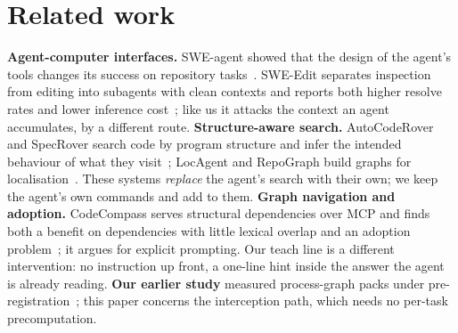 \documentclass[conference]{IEEEtran}
\begin{document}
\section{Related work}\label{sec:related}
\textbf{Agent-computer interfaces.} SWE-agent showed that the design of the agent's tools changes its success on
repository tasks~\cite{yang2024sweagent}. SWE-Edit separates inspection from editing into subagents with clean contexts
and reports both higher resolve rates and lower inference cost~\cite{zhang2026sweedit}; like us it attacks the context an
agent accumulates, by a different route. \textbf{Structure-aware search.} AutoCodeRover and SpecRover search code by
program structure and infer the intended behaviour of what they visit~\cite{zhang2024autocoderover,ruan2025specrover};
LocAgent and RepoGraph build graphs for localisation~\cite{chen2025locagent,ouyang2025repograph}. These systems
\emph{replace} the agent's search with their own; we keep the agent's own commands and add to them. \textbf{Graph
navigation and adoption.} CodeCompass serves structural dependencies over MCP and finds both a benefit on dependencies
with little lexical overlap and an adoption problem~\cite{paipuru2026codecompass}; it argues for explicit prompting. Our
teach line is a different intervention: no instruction up front, a one-line hint inside the answer the agent is already
reading. \textbf{Our earlier study} measured process-graph packs under pre-registration~\cite{le2026precomputed}; this
paper concerns the interception path, which needs no per-task precomputation.
\end{document}
